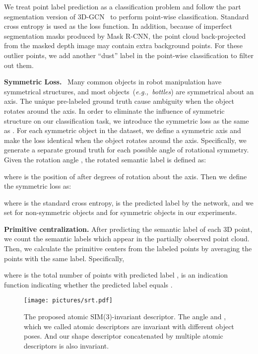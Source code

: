 \documentclass{article}
\begin{document}
We treat point label prediction as a classification problem and follow the part segmentation version of 3D-GCN~\cite{3D-GCN} to perform point-wise classification. 
Standard cross entropy is used as the loss function. 
In addition, because of imperfect segmentation masks produced by Mask R-CNN, the point cloud back-projected from the masked depth image may contain extra background points. 
For these outlier points, we add another ``dust'' label in the point-wise classification to filter out them.

\textbf{Symmetric Loss.}~
Many common objects in robot manipulation have symmetrical structures, and most objects~(\emph{e.g.,~bottles}) are symmetrical about an axis. The unique pre-labeled ground truth cause ambiguity when the object rotates around the axis. In order to eliminate the influence of symmetric structure on our classification task, we introduce the symmetric loss as the same as \cite{NOCS}. For each symmetric object in the dataset, we define a symmetric axis and make the loss identical when the object rotates around the axis. Specifically, we generate a separate ground truth for each possible angle of rotational symmetry. Given the rotation angle , the rotated semantic label  is defined as:

where  is the position of  after  degrees of rotation about the axis. Then we define the symmetric loss  as:

where  is the standard cross entropy,  is the predicted label by the network, and we set  for non-symmetric objects and  for symmetric objects in our experiments. 

\textbf{Primitive centralization.}
After predicting the semantic label of each 3D point, we count the semantic labels  which appear in the partially observed point cloud. Then, we calculate the primitive centers  from the labeled points by averaging the points with the same label. Specifically, 

where  is the total number of points with predicted label ,  is an indication function indicating  whether the predicted label  equals .

\begin{figure}[t]
    \centering
    \setlength{\abovecaptionskip}{0.cm}
    \texttt{[image: pictures/srt.pdf]}
     \caption{The proposed atomic SIM(3)-invariant descriptor. The angle  and , which we called atomic descriptors are invariant with different object poses. And our shape descriptor concatenated by multiple atomic descriptors is also invariant.}
    \label{fig:srt_feature}
\vspace{-0.4cm}
\end{figure}
\end{document}
